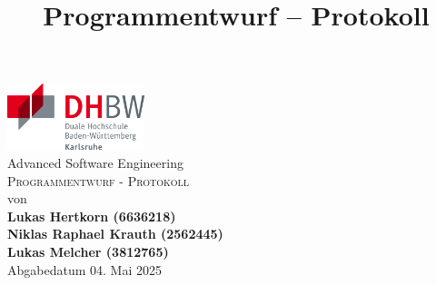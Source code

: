 \documentclass{article}
\title{Programmentwurf – Protokoll}
\begin{document}
\begin{titlepage}
\begin{center}
\vspace*{-2cm}
\hfill\includegraphics[width=4cm]{dhbw-logo.png}\\[2cm]
{\Huge Advanced Software Engineering}\\[1cm]
{\Huge\scshape Programmentwurf - Protokoll}\\[1cm]
{\large von}\\[0.5cm]

{\large\bfseries Lukas Hertkorn (6636218)}\\[0.5cm]
{\large\bfseries Niklas Raphael Krauth (2562445)}\\[0.5cm]
{\large\bfseries Lukas Melcher (3812765)}\\[1.5cm]

{\large Abgabedatum 04. Mai 2025}
\vfill
\end{center}
\end{titlepage}

\newcommand{\task}[1]{\textit{\textcolor{sickblue}{[#1]}\newline\newline}}

{
  \hypersetup{linkcolor=black}
  \tableofcontents
}








\end{document}
